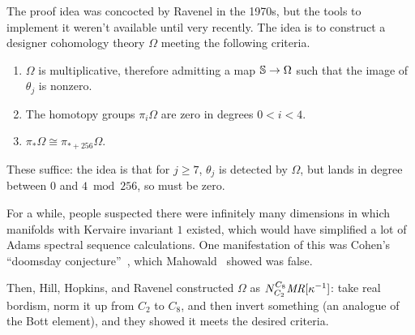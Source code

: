 The proof idea was concocted by Ravenel in the 1970s, but the tools to implement it weren't available until very
recently. The idea is to construct a designer cohomology theory $\Omega$ meeting the following criteria.
\begin{enumerate}
	\item $\Omega$ is multiplicative, therefore admitting a map $\mathbb S\to\Omega$ such that the image of $\theta_j$
	is nonzero.
	\item The homotopy groups $\pi_i\Omega$ are zero in degrees $0 < i < 4$.
	\item $\pi_*\Omega\cong\pi_{*+256}\Omega$.
\end{enumerate}
These suffice: the idea is that for $j\ge 7$, $\theta_j$ is detected by $\Omega$, but lands in degree between $0$
and $4\bmod 256$, so must be zero.
\begin{rem}
For a while, people suspected there were infinitely many dimensions in which manifolds with Kervaire invariant $1$
existed, which would have simplified a lot of Adams spectral sequence calculations. One manifestation of this was
Cohen's ``doomsday conjecture''~\cite{Doomsday}, which Mahowald~\cite{NoDoomsday} showed was false.
\end{rem}
Then, Hill, Hopkins, and Ravenel constructed $\Omega$ as $N_{C_2}^{C_8}\mathit{MR}[\kappa^{-1}]$: take real bordism, norm
it up from $C_2$ to $C_8$, and then invert something (an analogue of the Bott element), and they showed it meets
the desired criteria.
